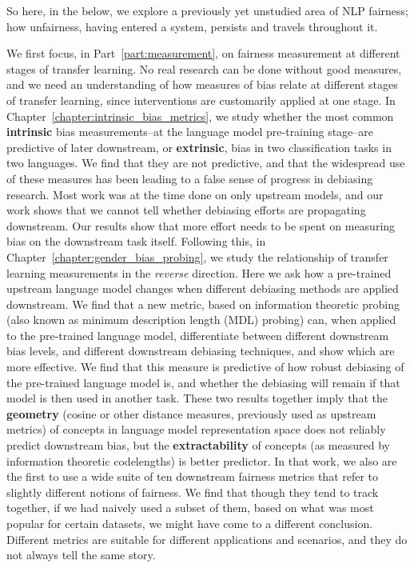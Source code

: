 So here, in the below, we explore a previously yet unstudied area of NLP fairness; how unfairness, having entered a system, persists and travels throughout it. 

We first focus, in Part~\ref{part:measurement}, on fairness measurement at different stages of transfer learning. No real research can be done without good measures, and we need an understanding of how measures of bias relate at different stages of transfer learning, since interventions are customarily applied at one stage. In Chapter~\ref{chapter:intrinsic_bias_metrics}, we study whether the most common \textbf{intrinsic} bias measurements--at the language model pre-training stage--are predictive of later downstream, or \textbf{extrinsic}, bias in two classification tasks in two languages. We find that they are not predictive, and that the widespread use of these measures has been leading to a false sense of progress in debiasing research. Most work was at the time done on only upstream models, and our work shows that we cannot tell whether debiasing efforts are propagating downstream. Our results show that more effort needs to be spent on measuring bias on the downstream task itself. Following this, in Chapter~\ref{chapter:gender_bias_probing}, we study the relationship of transfer learning measurements in the \textit{reverse} direction. Here we ask how a pre-trained upstream language model changes when different debiasing methods are applied downstream. We find that a new metric, based on information theoretic probing (also known as minimum description length (MDL) probing) \citep{} can, when applied to the pre-trained language model, differentiate between different downstream bias levels, and different downstream debiasing techniques, and show which are more effective. We find that this measure is predictive of how robust debiasing of the pre-trained language model is, and whether the debiasing will remain if that model is then used in another task. These two results together imply that the \textbf{geometry} (cosine or other distance measures, previously used as upstream metrics) of concepts in language model representation space does not reliably predict downstream bias, but the \textbf{extractability} of concepts (as measured by information theoretic codelengths) is better predictor. In that work, we also are the first to use a wide suite of ten downstream fairness metrics that refer to slightly different notions of fairness. We find that though they tend to track together, if we had naively used a subset of them, based on what was most popular for certain datasets, we might have come to a different conclusion. Different metrics are suitable for different applications and scenarios, and they do not always tell the same story. 

